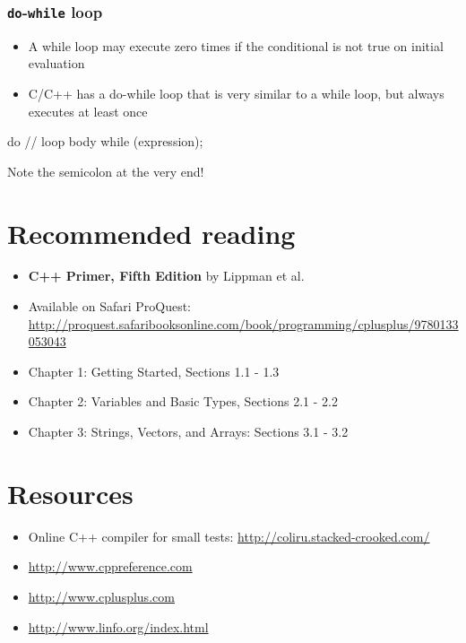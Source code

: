 \documentclass[12pt,letterpaper,twoside]{article}
\begin{document}
\subsubsection{\texorpdfstring{\texttt{do}-\texttt{while} loop}{do-while loop}}
\begin{itemize}
\item
  A while loop may execute zero times if the conditional is not true on
  initial evaluation
\item
  C/C++ has a do-while loop that is very similar to a while loop, but
  always executes at least once
\end{itemize}

\begin{cpp}
do {
  // loop body
} while (expression);
\end{cpp}

Note the semicolon at the very end!
\newpage
\section{Recommended reading}
\begin{itemize}
\item
  \textbf{C++ Primer, Fifth Edition} by Lippman et al.
\item
  Available on Safari ProQuest:
  \url{http://proquest.safaribooksonline.com/book/programming/cplusplus/9780133053043}
\item
  Chapter 1: Getting Started, Sections 1.1 - 1.3
\item
  Chapter 2: Variables and Basic Types, Sections 2.1 - 2.2
\item
  Chapter 3: Strings, Vectors, and Arrays: Sections 3.1 - 3.2
\end{itemize}

\section{Resources}
\begin{itemize}
\item
  Online C++ compiler for small tests:
  \url{http://coliru.stacked-crooked.com/}
\item
  \url{http://www.cppreference.com}
\item
  \url{http://www.cplusplus.com}
\item
  \url{http://www.linfo.org/index.html}
\end{itemize}
\end{document}
